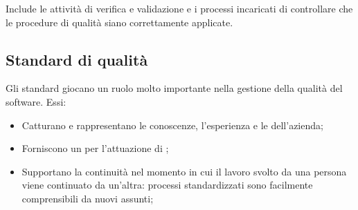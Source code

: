 Include le attività di verifica e validazione e i processi incaricati di controllare che le procedure di qualità siano correttamente applicate.

\subsection{Standard di qualità}
Gli standard giocano un ruolo molto importante nella gestione della qualità del software. Essi:
\begin{itemize}
	\item Catturano e rappresentano le conoscenze, l'esperienza e le  dell'azienda;
	\item Forniscono un  per l'attuazione di ;
	\item Supportano la continuità nel momento in cui il lavoro svolto da una persona viene continuato da un'altra: processi standardizzati sono facilmente comprensibili da nuovi assunti;
\end{itemize}
